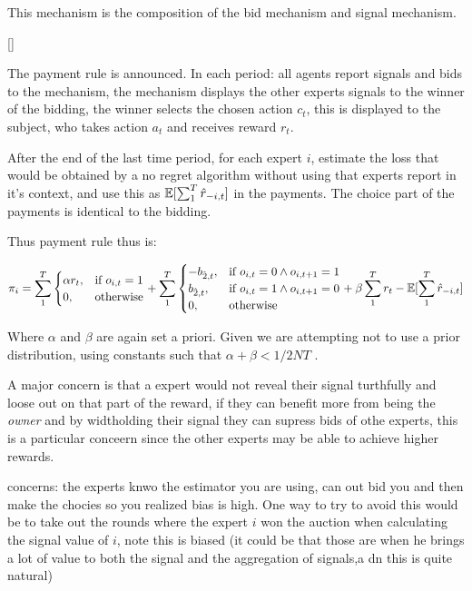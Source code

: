 This mechanism is the composition of the bid mechanism and signal mechanism.


\begin{mech}\label{mech:bidbandit}[]



The payment rule is announced. In each period: all agents report signals and bids to the mechanism, the mechanism displays the other experts signals to the winner of the bidding, the winner selects the chosen action $c_t$, this is displayed to the subject, who takes action $a_t$ and receives reward $r_t$.

After the end of the last time period, for each expert $i$, estimate the loss that would be obtained by a no regret algorithm without using that experts report in it's context, and use this as $\operatorname*{\mathbb E}[\sum_1^T \hat{r}_{-i,t}]$ in the payments. The choice part of the payments is identical to the bidding.


Thus payment rule thus is:


\[
    \pi_i =  \sum_1^T
\begin{cases}
    \alpha r_t ,& \text{if } o_{i,t} = 1\\
     0,              & \text{otherwise}
\end{cases}
+
\sum_1^T
\begin{cases}
     - b_{\hat{2},t} ,& \text{if } o_{i,t} = 0 \land o_{i,t+1} = 1\\
       b_{\hat{2},t} ,& \text{if } o_{i,t} = 1 \land o_{i,t+1} = 0 \\
	   0,              & \text{otherwise}
\end{cases}
  +  \beta \sum_1^T r_t -  \expec[\sum_1^T \hat{r}_{-i,t}]
\]

 

Where $\alpha$ and $\beta$ are again set a priori. Given we are attempting not to use a prior distribution, using  constants such that  $\alpha + \beta < 1/2NT$ .

\end{mech}

 A major concern is that a expert would not reveal their signal turthfully and loose out on that part of the reward, if they can benefit more from being the \emph{owner} and by widtholding their signal they can supress bids of othe experts, this is a particular conceern since the other experts may be able to achieve higher rewards.

 concerns: the experts knwo the estimator you are using, can out bid you and then make the chocies so you realized bias is high. One way to try to avoid this would be to take out the rounds where the expert $i$ won the auction when calculating the signal value of $i$, note this is biased (it could be that those are when he brings a lot of value to both the signal and the aggregation of signals,a dn this is quite natural)






